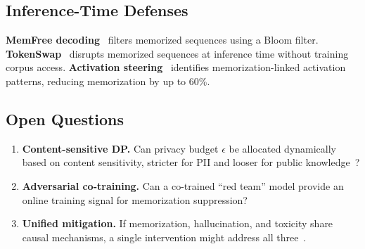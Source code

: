 \documentclass[11pt]{article}
\begin{document}
\subsection{Inference-Time Defenses}

\textbf{MemFree decoding}~\citep{ippolito-etal-2023-preventing} filters
memorized sequences using a Bloom filter.
\textbf{TokenSwap}~\citep{prashanttokenswap} disrupts memorized sequences at
inference time without training corpus access.
\textbf{Activation steering}~\citep{suri2025mitigating} identifies
memorization-linked activation patterns, reducing memorization by up to 60\%.

\subsection{Open Questions}

\begin{enumerate}[nosep]
  \item \textbf{Content-sensitive DP.} Can privacy budget $\epsilon$ be
    allocated dynamically based on content sensitivity, stricter for PII and
    looser for public knowledge~\citep{chua2024mind,ma2024efficient}?
  \item \textbf{Adversarial co-training.} Can a co-trained ``red team'' model
    provide an online training signal for memorization suppression?
  \item \textbf{Unified mitigation.} If memorization, hallucination, and
    toxicity share causal mechanisms, a single intervention might address all
    three~\citep{bender2021dangers}.
\end{enumerate}
\end{document}
